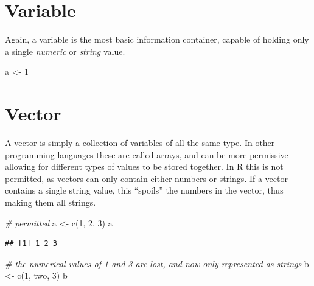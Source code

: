 \documentclass[
]{book}
\newenvironment{Shaded}{\begin{snugshade}}{\end{snugshade}}
\newcommand{\CommentTok}[1]{\textcolor[rgb]{0.56,0.35,0.01}{\textit{#1}}}
\newcommand{\DecValTok}[1]{\textcolor[rgb]{0.00,0.00,0.81}{#1}}
\newcommand{\FunctionTok}[1]{\textcolor[rgb]{0.00,0.00,0.00}{#1}}
\newcommand{\NormalTok}[1]{#1}
\newcommand{\OtherTok}[1]{\textcolor[rgb]{0.56,0.35,0.01}{#1}}
\newcommand{\StringTok}[1]{\textcolor[rgb]{0.31,0.60,0.02}{#1}}
\begin{document}
\hypertarget{variable}{%
\section{Variable}\label{variable}}

Again, a variable is the most basic information container, capable of holding only a single \emph{numeric} or \emph{string} value.

\begin{Shaded}
\begin{Highlighting}[]
\NormalTok{a }\OtherTok{\textless{}{-}} \DecValTok{1}
\end{Highlighting}
\end{Shaded}

\hypertarget{vector}{%
\section{Vector}\label{vector}}

A vector is simply a collection of variables of all the same type. In other programming languages these are called arrays, and can be more permissive allowing for different types of values to be stored together. In R this is not permitted, as vectors can only contain either numbers or strings. If a vector contains a single string value, this ``spoils'' the numbers in the vector, thus making them all strings.

\begin{Shaded}
\begin{Highlighting}[]
\CommentTok{\# permitted}
\NormalTok{a }\OtherTok{\textless{}{-}} \FunctionTok{c}\NormalTok{(}\DecValTok{1}\NormalTok{, }\DecValTok{2}\NormalTok{, }\DecValTok{3}\NormalTok{)}
\NormalTok{a}
\end{Highlighting}
\end{Shaded}

\begin{verbatim}
## [1] 1 2 3
\end{verbatim}

\begin{Shaded}
\begin{Highlighting}[]
\CommentTok{\# the numerical values of 1 and 3 are lost, and now only represented as strings}
\NormalTok{b }\OtherTok{\textless{}{-}} \FunctionTok{c}\NormalTok{(}\DecValTok{1}\NormalTok{, }\StringTok{\textquotesingle{}two\textquotesingle{}}\NormalTok{, }\DecValTok{3}\NormalTok{)}
\NormalTok{b}
\end{Highlighting}
\end{Shaded}
\end{document}
